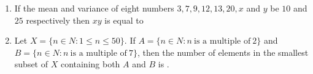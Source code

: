 \documentclass[journal,12pt,onecolumn]{IEEEtran}
\begin{document}
\begin{enumerate}
\item  If the mean and variance of eight numbers $3, 7, 9, 12, 13, 20, x$ and $y$ be $10$ and $25$ respectively then $xy$ is equal to

\item Let $X = \{n \in N: 1 \leq n \leq 50\}$. If $A= \{n \in N: n \ \text{is a multiple of} \ 2\}$ and $B = \{n \in N: n \ \text{is a multiple of} \ 7\}$, then the number of elements in the smallest subset of $X$ containing both $A$ and $B$ is .









\end{enumerate}
\end{document}
